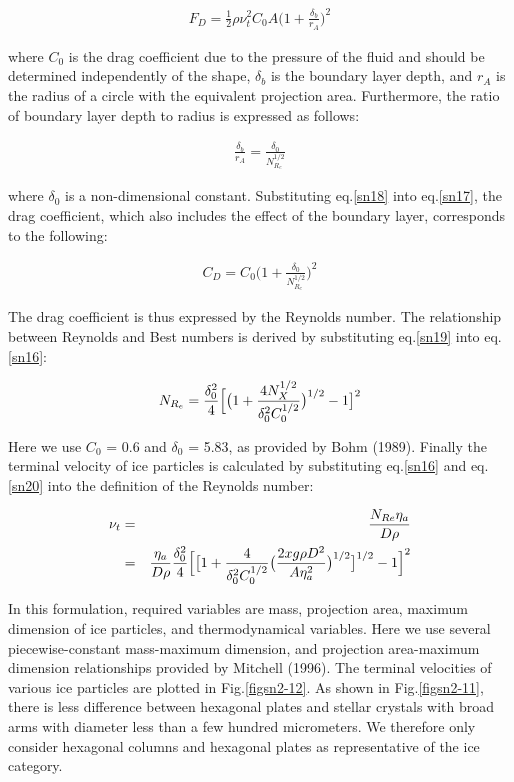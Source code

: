 \begin{eqnarray}
F_{D}=\frac{1}{2}\rho \nu_{t}^{2}C_{0}A\bigl(1+\frac{\delta_{b}}{r_{A}}\bigl)^{2}
\label{sn17}
\end{eqnarray}

where $C_{0}$ is the drag coefficient due to the pressure of the fluid and should be determined independently of the shape, $\delta_{b}$ is the boundary layer depth, and $r_{A}$ is the radius of a circle with the equivalent projection area. Furthermore, the ratio of boundary layer depth to radius is expressed as follows:

\begin{eqnarray}
\frac{\delta_{b}}{r_{A}}=\frac{\delta_{0}}{N_{R_{e}}^{1/2}}
\label{sn18}
\end{eqnarray}

where $\delta_{0}$ is a non-dimensional constant. Substituting eq.\ref{sn18} into eq.\ref{sn17}, the drag coefficient, which also includes the effect of the boundary layer, corresponds to the following:

\begin{eqnarray}
C_{D}=C_{0}\bigl(1+\frac{\delta_{0}}{N_{R_{e}}^{1/2}}\bigr)^{2}
\label{sn19}
\end{eqnarray}

The drag coefficient is thus expressed by the Reynolds number. The relationship between Reynolds and Best numbers is derived by substituting eq.\ref{sn19} into eq.\ref{sn16}:

\begin{eqnarray}
N_{R_{e}}=\frac{\delta_{0}^{2}}{4}\Bigl[\bigr(1+\frac{4N_{X}^{1/2}}{\delta_{0}^{2}C_{0}^{1/2}}\bigr)^{1/2}-1 \bigr]^{2}
\label{sn20}
\end{eqnarray}

Here we use $C_{0}$ = 0.6 and $\delta_{0}$ = 5.83, as provided by Bohm (1989). Finally the terminal velocity of ice particles is calculated by substituting eq.\ref{sn16} and eq.\ref{sn20} into the definition of the Reynolds number:

\begin{eqnarray}
\nu_{t}&=&\frac{N_{Re}\eta_{a}}{D\rho}\nonumber\\
&=&\frac{\eta_{a}}{D\rho}\frac{\delta_{0}^{2}}{4}\Bigl[\bigl[1+\frac{4}{\delta_{0}^{2}C_{0}^{1/2}}\bigr(\frac{2xg\rho D^{2}}{A\eta_{a}^{2}}\bigl)^{1/2}\bigr]^{1/2}-1\Bigr]^{2}
\label{sn21}
\end{eqnarray}

In this formulation, required variables are mass, projection area, maximum dimension of ice particles, and thermodynamical variables. Here we use several piecewise-constant mass-maximum dimension, and projection area-maximum dimension relationships provided by Mitchell (1996). The terminal velocities of various ice particles are plotted in Fig.\ref{figsn2-12}. As shown in Fig.\ref{figsn2-11}, there is less difference between hexagonal plates and stellar crystals with broad arms with diameter less than a few hundred micrometers. We therefore only consider hexagonal columns and hexagonal plates as representative of the ice category.


